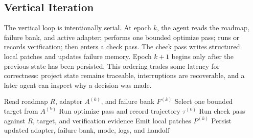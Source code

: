 \begin{table}[t]
\centering
\small
{}
\caption{The deep-learning analogy used by \ours{} is non-parametric: all updates are external state updates.}
\label{tab:mapping}
\end{table}

\subsection{Vertical Iteration}

The vertical loop is intentionally serial. At epoch $k$, the agent reads the roadmap, failure bank, and active adapter; performs one bounded optimize pass; runs or records verification; then enters a check pass. The check pass writes structured local patches and updates failure memory. Epoch $k+1$ begins only after the previous state has been persisted. This ordering trades some latency for correctness: project state remains traceable, interruptions are recoverable, and a later agent can inspect why a decision was made.

\begin{algorithm}[t]
\caption{\ours{} vertical epoch}
\label{alg:epoch}
\begin{algorithmic}[1]
\STATE Read roadmap $R$, adapter $A^{(k)}$, and failure bank $F^{(k)}$
\STATE Select one bounded target from $A^{(k)}$
\STATE Run optimize pass and record trajectory $\tau^{(k)}$
\STATE Run check pass against $R$, target, and verification evidence
\STATE Emit local patches $P^{(k)}$
\STATE Persist updated adapter, failure bank, mode, logs, and handoff
\end{algorithmic}
\end{algorithm}

